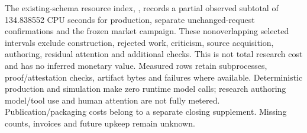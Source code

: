 
The existing-schema resource index, , records a partial observed subtotal of 134.838552 CPU seconds for production, separate unchanged-request confirmations and the frozen market campaign. These nonoverlapping selected intervals exclude construction, rejected work, criticism, source acquisition, authoring, residual attention and additional checks. This is not total research cost and has no inferred monetary value. Measured rows retain subprocesses, proof/attestation checks, artifact bytes and failures where available. Deterministic production and simulation make zero runtime model calls; research authoring model/tool use and human attention are not fully metered. Publication/packaging costs belong to a separate closing supplement. Missing counts, invoices and future upkeep remain unknown.
